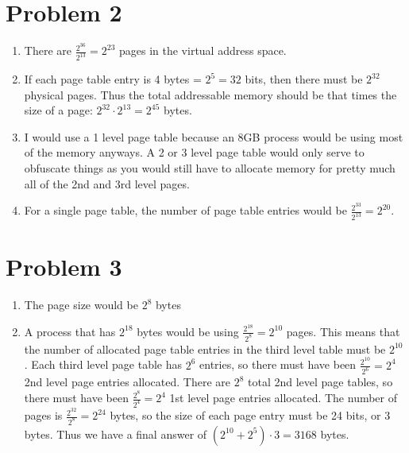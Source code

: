 \documentclass{article}
\begin{document}
\section*{Problem 2}
\begin{enumerate}[label=\alph*)]
\item There are $\frac{2^{36}}{2^{13}} = 2^{23}$ pages in the virtual address space. \\
\item If each page table entry is 4 bytes = $2^5 = 32$ bits, then there must be $2^{32}$ physical pages. Thus the total addressable memory should be that times the size of a page: $2^{32} \cdot 2^{13} = 2^{45}$ bytes. \\
\item I would use a 1 level page table because an 8GB process would be using most of the memory anyways. A 2 or 3 level page table would only serve to obfuscate things as you would still have to allocate memory for pretty much all of the 2nd and 3rd level pages. \\
\item For a single page table, the number of page table entries would be $\frac{2^33}{2^13} = 2^{20}$.
\end{enumerate}
\section*{Problem 3}
\begin{enumerate}[label=\alph*)]
\item The page size would be $2^8$ bytes\\
\item A process that has $2^{18}$ bytes would be using $\frac{2^{18}}{2^8} = 2^{10}$ pages. This means that the number of allocated page table entries in the third level table must be $2^{10}$. Each third level page table has $2^6$ entries, so there must have been $\frac{2^{10}}{2^6} = 2^4$ 2nd level page entries allocated. There are $2^8$ total 2nd level page tables, so there must have been $\frac{2^8}{2^4} = 2^4$ 1st level page entries allocated. The number of pages is $\frac{2^{32}}{2^8} = 2^{24}$ bytes, so the size of each page entry must be 24 bits, or 3 bytes. Thus we have a final answer of $(2^{10} + 2^{5}) \cdot 3 = 3168$ bytes. \\
\end{enumerate}
\end{document}
